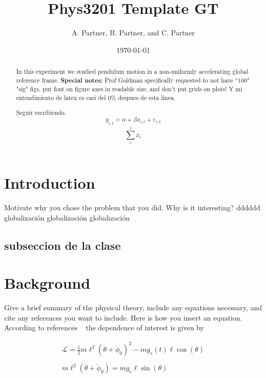 \documentclass[letterpaper,12pt]{article}
\begin{document}
\date{\today}
\title{Phys3201 Template GT}
\author{A. Partner, B. Partner, and C. Partner}


\maketitle

\begin{abstract}
In this experiment we studied pendulum motion in a non-uniformly 
accelerating global reference frame. \textbf{Special notes:} Prof Goldman 
specifically requested to not have ``100" "sig" figs, put font on 
figure axes in readable size, and don't put grids on plots! Y mi
entendimiento de latex es casi del 0\% despues de esta linea.

Seguir escribiendo. $$y_{i,t}= \alpha + \beta x_{i,t} + \varepsilon_{i,t}$$
$$\sum_i^j x_i$$
\end{abstract}


\section{Introduction}

Motivate why you chose the problem that you did. Why is it interesting? dddddd globalización globalización globalización

\subsection{subseccion de la clase}

\blindtext %


\section{Background}

Give a brief summary of the physical theory, include any equations necessary, and cite any references you want to include. Here is how you insert an equation. According to references ~\cite{melissinos, Cyr, Wiki} the dependence of interest is given
by


\begin{gather*}
   \mathcal{L} =  \frac{1}{2} m \ell^2 ( \dot{\theta}+\dot{\phi}_0)^2 - m g_e(t) \ell \cos(\theta)\\
   \\
   m\ell^2 (\ddot{\theta} + \ddot{\phi}_0) = mg_e\ell\sin(\theta)\\
\end{gather*}
\end{document}
